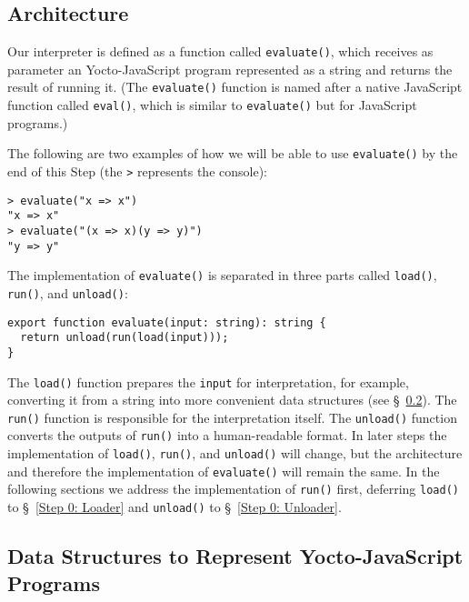 \documentclass[12pt, oneside]{book}
\begin{document}
\subsection{Architecture}
\label{Architecture}

Our interpreter is defined as a function called \texttt{evaluate()}, which receives as parameter an Yocto-JavaScript program represented as a string and returns the result of running it. (The \texttt{evaluate()} function is named after a native JavaScript function called \texttt{eval()}, which is similar to \texttt{evaluate()} but for JavaScript programs.)

The following are two examples of how we will be able to use \texttt{evaluate()} by the end of this Step (the \texttt{>} represents the console):

\begin{verbatim}
> evaluate("x => x")
"x => x"
> evaluate("(x => x)(y => y)")
"y => y"
\end{verbatim}

The implementation of \texttt{evaluate()} is separated in three parts called \texttt{load()}, \texttt{run()}, and \texttt{unload()}:

\begin{verbatim}
export function evaluate(input: string): string {
  return unload(run(load(input)));
}
\end{verbatim}

The \texttt{load()} function prepares the \texttt{input} for interpretation, for example, converting it from a string into more convenient data structures (see §~\ref{Data Structures to Represent Yocto-JavaScript Programs}). The \texttt{run()} function is responsible for the interpretation itself. The \texttt{unload()} function converts the outputs of \texttt{run()} into a human-readable format. In later steps the implementation of \texttt{load()}, \texttt{run()}, and \texttt{unload()} will change, but the architecture and therefore the implementation of \texttt{evaluate()} will remain the same. In the following sections we address the implementation of \texttt{run()} first, deferring \texttt{load()} to §~\ref{Step 0: Loader} and \texttt{unload()} to §~\ref{Step 0: Unloader}.

\subsection{Data Structures to Represent Yocto-JavaScript Programs}
\label{Data Structures to Represent Yocto-JavaScript Programs}
\end{document}
